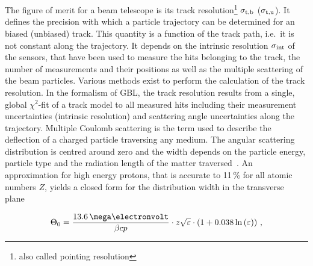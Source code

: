 The figure of merit for a beam telescope is its track resolution\footnote{also called pointing resolution} $\sigma_{\textrm{t,b}}$ ($\sigma_{\textrm{t,u}}$).
It defines the precision with which a particle trajectory can be determined for an biased (unbiased) track. 
This quantity is a function of the track path, i.e.\ it is not constant along the trajectory. 
It depends on the intrinsic resolution $\sigma_{\textrm{int}}$ of the sensors, that have been used to measure the hits belonging to the track, the number of measurements and their positions
 as well as the multiple scattering of the beam particles.
Various methods exist to perform the calculation of the track resolution. 
In the formalism of GBL, the track resolution results from a single, global $\chi^2$-fit of a track model to all measured hits including their measurement uncertainties (intrinsic resolution)
 and scattering angle uncertainties along the trajectory. 
% 
%
%
%
%
%
Multiple Coulomb scattering is the term used to describe the deflection of a charged particle traversing any medium.
The angular scattering distribution is centred around zero
 and the width depends on the particle energy, particle type and the radiation length of the matter traversed~\cite{ref:scatteringhighland}.
An approximation for high energy protons, that is accurate to 11\,\% for all atomic numbers $Z$, yields a closed form for the distribution width in the transverse plane~\cite{ref:PDG-2014}

\begin{equation}
\label{eq:multiplescattering}
\Theta_{0} = \frac{13.6\,\mega\electronvolt}{\beta c p} \cdot z
\sqrt{\varepsilon}
\cdot \left( 1 + 0.038 \ln{\left( \varepsilon \right) } \right) \,,
\end{equation}

